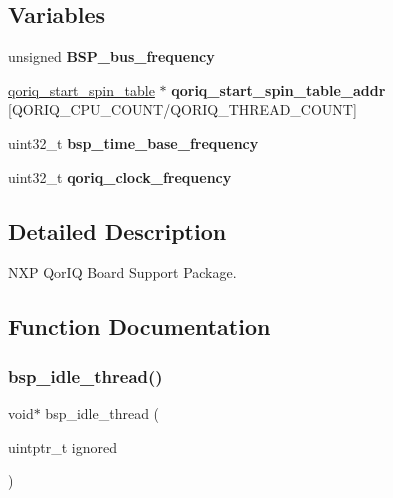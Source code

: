 \subsection*{Variables}
\begin{DoxyCompactItemize}
\item 
\mbox{\label{group__RTEMSBSPsPowerPCQorIQ_gad76aba6c1c189e00e4d1cd583b52a18e}} 
unsigned {\bfseries B\+S\+P\+\_\+bus\+\_\+frequency}
\item 
\mbox{\label{group__RTEMSBSPsPowerPCQorIQ_ga468c5e4d03ce999f1d60d0bcece15a34}} 
\mbox{\hyperlink{structqoriq__start__spin__table}{qoriq\+\_\+start\+\_\+spin\+\_\+table}} $\ast$ {\bfseries qoriq\+\_\+start\+\_\+spin\+\_\+table\+\_\+addr} \mbox{[}Q\+O\+R\+I\+Q\+\_\+\+C\+P\+U\+\_\+\+C\+O\+U\+NT/Q\+O\+R\+I\+Q\+\_\+\+T\+H\+R\+E\+A\+D\+\_\+\+C\+O\+U\+NT\mbox{]}
\item 
\mbox{\label{group__RTEMSBSPsPowerPCQorIQ_ga90264c44b2ad45b187acedda94154541}} 
uint32\+\_\+t {\bfseries bsp\+\_\+time\+\_\+base\+\_\+frequency}
\item 
\mbox{\label{group__RTEMSBSPsPowerPCQorIQ_gadc6f75ea71ae3caeb42c9443a4a85ba3}} 
uint32\+\_\+t {\bfseries qoriq\+\_\+clock\+\_\+frequency}
\end{DoxyCompactItemize}


\subsection{Detailed Description}
N\+XP Qor\+IQ Board Support Package. 



\subsection{Function Documentation}
\mbox{\label{group__RTEMSBSPsPowerPCQorIQ_ga301be7085b80c41a9c5887247003c662}} 
\subsubsection{\texorpdfstring{bsp\_idle\_thread()}{bsp\_idle\_thread()}}
{\footnotesize\ttfamily void$\ast$ bsp\+\_\+idle\+\_\+thread (\begin{DoxyParamCaption}\item[{uintptr\+\_\+t}]{ignored }\end{DoxyParamCaption})}



